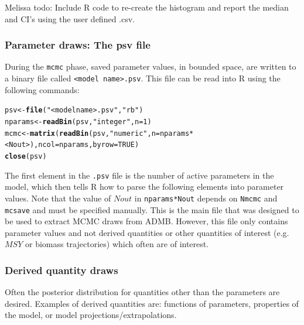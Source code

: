 \documentclass{article}\usepackage[]{graphicx}\usepackage[]{color}
\makeatletter
\newcommand{\hlstr}[1]{\textcolor[rgb]{0.192,0.494,0.8}{#1}}%
\newcommand{\hlkwd}[1]{\textcolor[rgb]{0.737,0.353,0.396}{\textbf{#1}}}%
\newenvironment{kframe}{%
 \def\at@end@of@kframe{}%
 \ifinner\ifhmode%
  \def\at@end@of@kframe{\end{minipage}}%
  \begin{minipage}{\columnwidth}%
 \fi\fi%
 \def\FrameCommand##1{\hskip\@totalleftmargin \hskip-\fboxsep
 \colorbox{shadecolor}{##1}\hskip-\fboxsep
     \hskip-\linewidth \hskip-\@totalleftmargin \hskip\columnwidth}%
 \MakeFramed {\advance\hsize-\width
   \@totalleftmargin\z@ \linewidth\hsize
   \@setminipage}}%
 {\par\unskip\endMakeFramed%
 \at@end@of@kframe}
\newenvironment{knitrout}{}{} %
\makeatother
\begin{document}
Melissa todo: Include R code to re-create the histogram and report the median 
and CI's using the user defined .csv.

\subsubsection{Parameter draws: The psv file}
During the \texttt{mcmc} phase, saved parameter values, in
bounded space, are written to a binary file called
\texttt{<model name>.psv}. This file can be read into R
using the following commands:
\begin{knitrout}
\color{fgcolor}\begin{kframe}
\begin{alltt}
psv <- \hlkwd{file}(\hlstr{"<model name>.psv"}, \hlstr{"rb"})
nparams <- \hlkwd{readBin}(psv, \hlstr{"integer"}, n=1)
mcmc <- \hlkwd{matrix}(\hlkwd{readBin}(psv, \hlstr{"numeric"}, n=nparams*<Nout>), ncol=nparams, byrow=TRUE)
\hlkwd{close}(psv)
\end{alltt}
\end{kframe}
\end{knitrout}
The first element in the \texttt{.psv} file is the number of
active parameters in the model, which then tells R how to
parse the following elements into parameter values. Note
that the value of $Nout$ in \texttt{nparams*Nout} depends on
\texttt{Nmcmc} and \texttt{mcsave} and must be specified
manually. This is the main file that was designed to be used
to extract MCMC draws from ADMB. However, this file only
contains parameter values and not derived quantities or
other quantities of interest (e.g. $MSY$ or biomass
trajectories) which often are of interest.
\subsubsection{Derived quantity draws}
Often the posterior distribution for quantities other than
the parameters are desired. Examples of derived quantities
are: functions of parameters, properties of the model, or
model projections/extrapolations.
\end{document}

